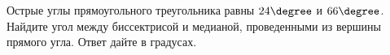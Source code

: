 \begin{ex}
	\begin{condition}
		Острые углы прямоугольного треугольника равны \( 24 \degree \) и \( 66 \degree \). Найдите угол между биссектрисой и медианой, проведенными из вершины прямого угла. Ответ дайте в градусах.
	\end{condition}
\end{ex}